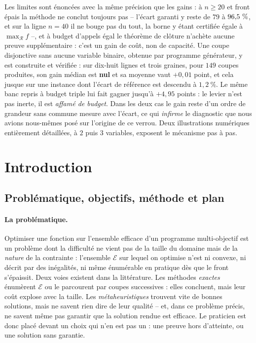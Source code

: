 \documentclass[11pt,a4paper]{article}
\theoremstyle{plain}
\theoremstyle{remark}
\newcommand{\Ecal}{\mathcal{E}}
\newcommand{\Rcal}{\mathcal{R}}
\begin{document}
Les limites sont énoncées avec la même précision que les gains : à $n\ge 20$
et front épais la méthode ne conclut toujours pas -- l'écart garanti y reste
de $79$ à $96{,}5{}\ \%$, et sur la ligne $n=40$ il ne bouge pas du tout, la
borne y étant certifiée égale à $\max_{\Rcal}f$ --, et à budget d'appels égal
le théorème de clôture n'achète aucune preuve supplémentaire : c'est un gain
de coût, non de capacité. Une coupe disjonctive sans aucune variable binaire, obtenue par
programme générateur, y est construite et vérifiée : sur dix-huit lignes et
trois graines, pour $149$ coupes produites, son gain médian est \textbf{nul}
et sa moyenne vaut $+0{,}01$ point, et cela jusque sur une instance dont
l'écart de référence est descendu à $1{,}2\ \%$. Le même banc repris à
budget triple lui fait gagner jusqu'à $+4{,}95$ points : le levier n'est pas
inerte, il est \emph{affamé de budget}. Dans les deux cas le gain reste
d'un ordre de grandeur sans commune mesure avec l'écart, ce qui
\emph{infirme} le diagnostic que nous avions nous-mêmes posé sur l'origine
de ce verrou. Deux illustrations numériques entièrement détaillées, à $2$ puis
$3$ variables, exposent le mécanisme pas à pas.
\clearpage

\section{Introduction}

\subsection{Problématique, objectifs, méthode et plan}
\label{sec:pbm}

\paragraph{La problématique.} Optimiser une fonction sur l'ensemble efficace
d'un programme multi-objectif est un problème dont la difficulté ne vient
pas de la taille du domaine mais de la \emph{nature} de la contrainte :
l'ensemble $\Ecal$ sur lequel on optimise n'est ni convexe, ni décrit par des
inégalités, ni même énumérable en pratique dès que le front s'épaissit.
Deux voies existent dans la littérature. Les méthodes \emph{exactes}
énumèrent $\Ecal$ ou le parcourent par coupes successives : elles concluent,
mais leur coût explose avec la taille. Les \emph{métaheuristiques} trouvent
vite de bonnes solutions, mais ne savent rien dire de leur qualité -- et,
dans ce problème précis, ne savent même pas garantir que la solution rendue
est efficace. Le praticien est donc placé devant un choix qui n'en est pas
un : une preuve hors d'atteinte, ou une solution sans garantie.
\end{document}
